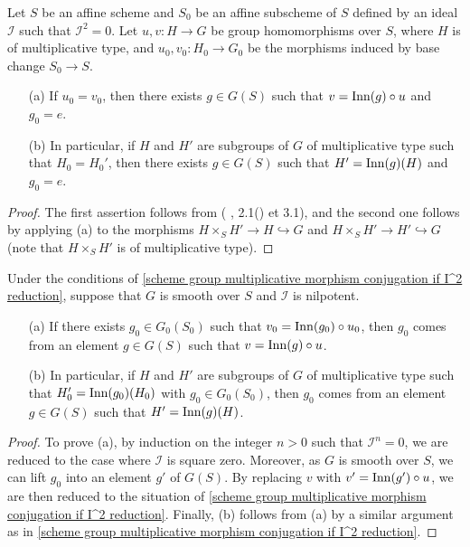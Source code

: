 \begin{theorem}\label{scheme group multiplicative morphism conjugation if I^2 reduction}
Let $S$ be an affine scheme and $S_0$ be an affine subscheme of $S$ defined by an ideal $\mathscr{I}$ such that $\mathscr{I}^2=0$. Let $u,v:H\to G$ be group homomorphisms over $S$, where $H$ is of multiplicative type, and $u_0,v_0:H_0\to G_0$ be the morphisms induced by base change $S_0\to S$.
\begin{enumerate}
    \item[(a)] If $u_0=v_0$, then there exists $g\in G(S)$ such that $v=\mathrm{Inn}(g)\circ u$ and $g_0=e$.
    \item[(b)] In particular, if $H$ and $H'$ are subgroups of $G$ of multiplicative type such that $H_0=H_0'$, then there exists $g\in G(S)$ such that $H'=\mathrm{Inn}(g)(H)$ and $g_0=e$.
\end{enumerate}
\end{theorem}
\begin{proof}
The first assertion follows from (\cite{SGA3-1} , 2.1() et 3.1), and the second one follows by applying (a) to the morphisms $H\times_SH'\to H\hookrightarrow G$ and $H\times_SH'\to H'\hookrightarrow G$ (note that $H\times_SH'$ is of multiplicative type).
\end{proof}

\begin{corollary}\label{scheme group multiplicative morphism conjugation if nilpotent reduction}
Under the conditions of \cref{scheme group multiplicative morphism conjugation if I^2 reduction}, suppose that $G$ is smooth over $S$ and $\mathscr{I}$ is nilpotent.
\begin{enumerate}
    \item[(a)] If there exists $g_0\in G_0(S_0)$ such that $v_0=\mathrm{Inn}(g_0)\circ u_0$, then $g_0$ comes from an element $g\in G(S)$ such that $v=\mathrm{Inn}(g)\circ u$.
    \item[(b)] In particular, if $H$ and $H'$ are subgroups of $G$ of multiplicative type such that $H_0'=\mathrm{Inn}(g_0)(H_0)$ with $g_0\in G_0(S_0)$, then $g_0$ comes from an element $g\in G(S)$ such that $H'=\mathrm{Inn}(g)(H)$.
\end{enumerate}
\end{corollary}
\begin{proof}
To prove (a), by induction on the integer $n>0$ such that $\mathscr{I}^n=0$, we are reduced to the case where $\mathscr{I}$ is square zero. Moreover, as $G$ is smooth over $S$, we can lift $g_0$ into an element $g'$ of $G(S)$. By replacing $v$ with $v'=\mathrm{Inn}(g')\circ u$, we are then reduced to the situation of \cref{scheme group multiplicative morphism conjugation if I^2 reduction}. Finally, (b) follows from (a) by a similar argument as in \cref{scheme group multiplicative morphism conjugation if I^2 reduction}.
\end{proof}

